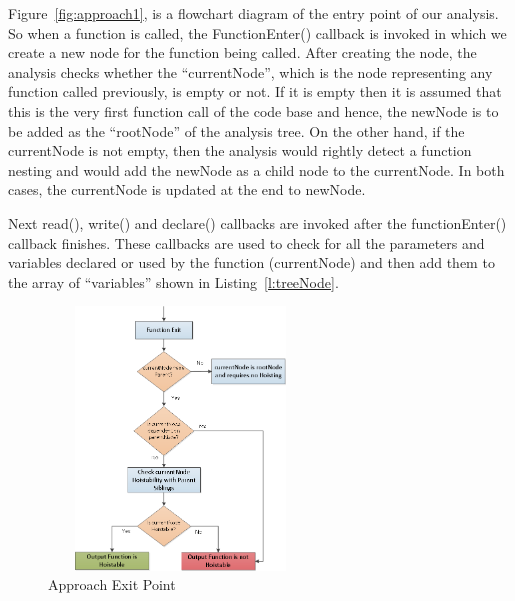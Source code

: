 \documentclass[authoryear,preprint]{sigplanconf}
\begin{document}
Figure~\ref{fig:approach1}, is a flowchart diagram of the entry point of our analysis. So when a function is called, the FunctionEnter() callback is invoked in which we create a new node for the function being called. After creating the node, the analysis checks whether the \enquote{currentNode}, which is the node representing any function called previously, is empty or not. If it is empty then it is assumed that this is the very first function call of the code base and hence, the newNode is to be added as the \enquote{rootNode} of the analysis tree. On the other hand, if the currentNode is not empty, then the analysis would rightly detect a function nesting and would add the newNode as a child node to the currentNode. In both cases, the currentNode is updated at the end to newNode.\par

Next read(), write() and declare() callbacks are invoked after the functionEnter() callback finishes. These callbacks are used to check for all the parameters and variables declared or used by the function (currentNode) and then add them to the array of \enquote{variables} shown in Listing~\ref{l:treeNode}.

\begin{figure}[H]
  \centering
  \includegraphics[width=7cm, height=7cm]{approach2.png}
  \caption{Approach Exit Point}
  \label{fig:approach2}
\end{figure}
\end{document}
